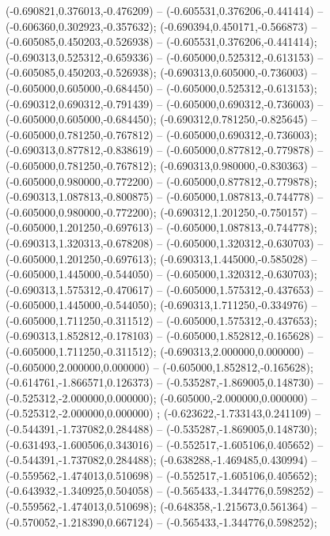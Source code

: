  (-0.690821,0.376013,-0.476209) -- (-0.605531,0.376206,-0.441414) -- (-0.606360,0.302923,-0.357632);
 (-0.690394,0.450171,-0.566873) -- (-0.605085,0.450203,-0.526938) -- (-0.605531,0.376206,-0.441414);
 (-0.690313,0.525312,-0.659336) -- (-0.605000,0.525312,-0.613153) -- (-0.605085,0.450203,-0.526938);
 (-0.690313,0.605000,-0.736003) -- (-0.605000,0.605000,-0.684450) -- (-0.605000,0.525312,-0.613153);
 (-0.690312,0.690312,-0.791439) -- (-0.605000,0.690312,-0.736003) -- (-0.605000,0.605000,-0.684450);
 (-0.690312,0.781250,-0.825645) -- (-0.605000,0.781250,-0.767812) -- (-0.605000,0.690312,-0.736003);
 (-0.690313,0.877812,-0.838619) -- (-0.605000,0.877812,-0.779878) -- (-0.605000,0.781250,-0.767812);
 (-0.690313,0.980000,-0.830363) -- (-0.605000,0.980000,-0.772200) -- (-0.605000,0.877812,-0.779878);
 (-0.690313,1.087813,-0.800875) -- (-0.605000,1.087813,-0.744778) -- (-0.605000,0.980000,-0.772200);
 (-0.690312,1.201250,-0.750157) -- (-0.605000,1.201250,-0.697613) -- (-0.605000,1.087813,-0.744778);
 (-0.690313,1.320313,-0.678208) -- (-0.605000,1.320312,-0.630703) -- (-0.605000,1.201250,-0.697613);
 (-0.690313,1.445000,-0.585028) -- (-0.605000,1.445000,-0.544050) -- (-0.605000,1.320312,-0.630703);
 (-0.690313,1.575312,-0.470617) -- (-0.605000,1.575312,-0.437653) -- (-0.605000,1.445000,-0.544050);
 (-0.690313,1.711250,-0.334976) -- (-0.605000,1.711250,-0.311512) -- (-0.605000,1.575312,-0.437653);
 (-0.690313,1.852812,-0.178103) -- (-0.605000,1.852812,-0.165628) -- (-0.605000,1.711250,-0.311512);
 (-0.690313,2.000000,0.000000) -- (-0.605000,2.000000,0.000000) -- (-0.605000,1.852812,-0.165628);
 (-0.614761,-1.866571,0.126373) -- (-0.535287,-1.869005,0.148730) -- (-0.525312,-2.000000,0.000000);
 (-0.605000,-2.000000,0.000000) -- (-0.525312,-2.000000,0.000000) ;
 (-0.623622,-1.733143,0.241109) -- (-0.544391,-1.737082,0.284488) -- (-0.535287,-1.869005,0.148730);
 (-0.631493,-1.600506,0.343016) -- (-0.552517,-1.605106,0.405652) -- (-0.544391,-1.737082,0.284488);
 (-0.638288,-1.469485,0.430994) -- (-0.559562,-1.474013,0.510698) -- (-0.552517,-1.605106,0.405652);
 (-0.643932,-1.340925,0.504058) -- (-0.565433,-1.344776,0.598252) -- (-0.559562,-1.474013,0.510698);
 (-0.648358,-1.215673,0.561364) -- (-0.570052,-1.218390,0.667124) -- (-0.565433,-1.344776,0.598252);
